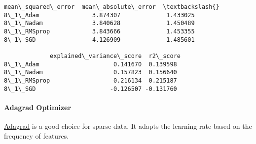 \documentclass[11pt]{article}
\makeatletter
\newcommand{\boxspacing}{\kern\kvtcb@left@rule\kern\kvtcb@boxsep}
\newcommand{\prompt}[4]{
        {\ttfamily\llap{{\color{#2}[#3]:\hspace{3pt}#4}}\vspace{-\baselineskip}}
    }
\makeatother
\begin{document}
            \begin{tcolorbox}[breakable, size=fbox, boxrule=.5pt, pad at break*=1mm, opacityfill=0]
\prompt{Out}{outcolor}{62}{\boxspacing}
\begin{Verbatim}[commandchars=\\\{\}]
             mean\_squared\_error  mean\_absolute\_error  \textbackslash{}
8\_1\_Adam               3.874307             1.433025
8\_1\_Nadam              3.840628             1.450489
8\_1\_RMSprop            3.843666             1.453355
8\_1\_SGD                4.126909             1.485601

             explained\_variance\_score  r2\_score
8\_1\_Adam                     0.141670  0.139598
8\_1\_Nadam                    0.157823  0.156640
8\_1\_RMSprop                  0.216134  0.215187
8\_1\_SGD                     -0.126507 -0.131760
\end{Verbatim}
\end{tcolorbox}
        
    \paragraph{Adagrad Optimizer}\label{adagrad-optimizer}

\href{https://keras.io/api/optimizers/adagrad/}{Adagrad} is a good
choice for sparse data. It adapts the learning rate based on the
frequency of features.
\end{document}
